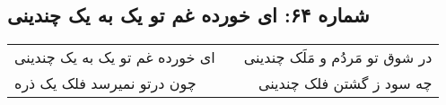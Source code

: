 \begin{center}
\section*{شماره ۶۴: ای خورده غم تو یک به یک چندینی}
\label{sec:064}
\begin{longtable}{l p{0.5cm} r}
ای خورده غم تو یک به یک چندینی
&&
در شوق تو مَردُم و مَلَک چندینی
\\
چون درتو نمیرسد فلک یک ذره
&&
چه سود ز گشتن فلک چندینی
\\
\end{longtable}
\end{center}
